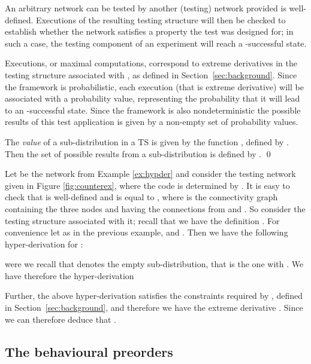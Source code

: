 \documentclass{LMCS}
\begin{document}
An arbitrary network  can be tested by another (testing) network  provided 
 is well-defined.
Executions of the resulting testing structure will then be checked to establish whether 
the network  satisfies a property the test was designed for; in such a case, the testing component 
of an experiment will reach a -successful state. 

Executions, or maximal computations, correspond to
extreme derivatives in the testing structure associated with , 
as defined in Section~\ref{sec:background}. 
Since the framework is probabilistic, each execution (that is  extreme derivative)  will be associated with 
a probability value, representing the probability that it will lead to an -successful state.
Since the framework is also nondeterministic the possible results of this test application is given by a
non-empty set of probability values. 
\begin{defi}\label{def:resultsets}
 The \emph{value} of a sub-distribution in a TS is given by the function   
,  defined by
    .
Then the set of possible results from a sub-distribution   is defined by  
. 
\qed
\end{defi}




\begin{exa}

Let  be the network from Example \ref{ex:hypder} and 
consider the testing network  given in 
Figure \ref{fig:counterex}, where the code is determined by
. 
It is easy to check that  is well-defined and is equal to 
, where  is the connectivity 
graph containing the three nodes  and having the connections from  and .
So consider the testing structure associated with it; recall that we have the definition 
. 
For convenience  let  as in the previous example, 
 and .
Then we have the following  hyper-derivation for :

  were we recall that  denotes the empty sub-distribution, that is the one with .
  We have therefore the hyper-derivation 
  
  Further, the above hyper-derivation satisfies the constraints required by , defined in Section~\ref{sec:background}, and 
  therefore we have the extreme derivative . 
  Since     we can therefore deduce that .
  \end{exa}

\subsection{The behavioural preorders}
\label{sec:maypreord}
\end{document}
